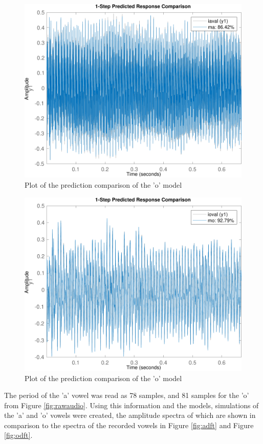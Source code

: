 \documentclass{IEEEtran}
\begin{document}
\begin{figure}[h!]
    \centering
    \captionsetup{justification=centering}
    \includegraphics[width=0.8\columnwidth]{pictures/compare_a.pdf}
    \caption{Plot of the prediction comparison of the 'o' model}
    \label{fig:comparea}
\end{figure}

\begin{figure}[h!]
    \centering
    \captionsetup{justification=centering}
    \includegraphics[width=0.8\columnwidth]{pictures/compare_o.pdf}
    \caption{Plot of the prediction comparison of the 'o' model}
    \label{fig:compareo}
\end{figure}

The period of the 'a' vowel was read as 78 samples, and 81 samples for the 'o'
from Figure \ref{fig:rawaudio}. Using this information and the models,
simulations of the 'a' and 'o' vowels were created, the amplitude spectra of
which are shown in comparison to the spectra of the recorded vowels in Figure 
\ref{fig:adft} and Figure \ref{fig:odft}.
\end{document}
